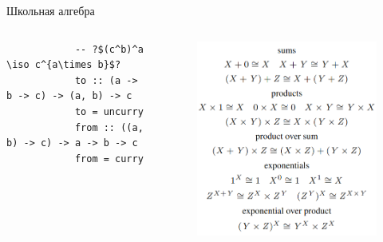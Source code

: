     \begin{frame}[fragile]{Школьная алгебра}
        \vspace{-1em}
        \begin{columns}[onlytextwidth]
            \begin{column}[t]{0.485\textwidth}
                \begin{verbatim}
            -- ?$(c^b)^a \iso c^{a\times b}$?
            to :: (a -> b -> c) -> (a, b) -> c
            to = uncurry
            from :: ((a, b) -> c) -> a -> b -> c
            from = curry
                \end{verbatim}
            \end{column}\hfill%
            \begin{column}[t]{0.485\textwidth}
                \pause
                \begin{figure}
                    \centering
                    \includegraphics[width=1\textwidth]{figs/school-alg}
                \end{figure}
            \end{column}
        \end{columns}
    \end{frame}

